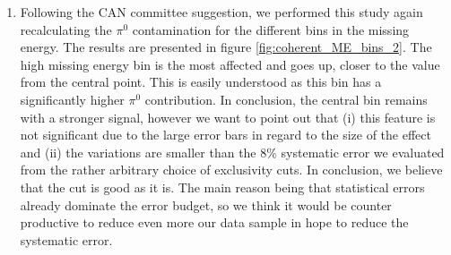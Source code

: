 \begin{enumerate}
\begin{enumerate}
 \item Following the CAN committee suggestion, we performed this study again
    recalculating the $\pi^0$ contamination for the different bins in the 
    missing energy. The results are presented in figure 
    \ref{fig:coherent_ME_bins_2}. The high missing energy bin is the
    most affected and goes up, closer to the value from the central point.    
    This is easily understood as this bin has a significantly higher $\pi^0$
    contribution. In conclusion, the central bin remains with a stronger 
    signal, however we want to point out that (i) this feature is not significant 
    due to the large error bars in regard to the size of the effect and 
    (ii) the variations are smaller than the 8\% systematic error we evaluated 
    from the rather arbitrary choice of exclusivity cuts. In conclusion, we
    believe that the cut is good as it is. The main reason being that 
    statistical errors already dominate the error budget, so we think it
    would be counter productive to reduce even more our data sample in hope to
    reduce the systematic error.
    

\end{enumerate}
\end{enumerate}
